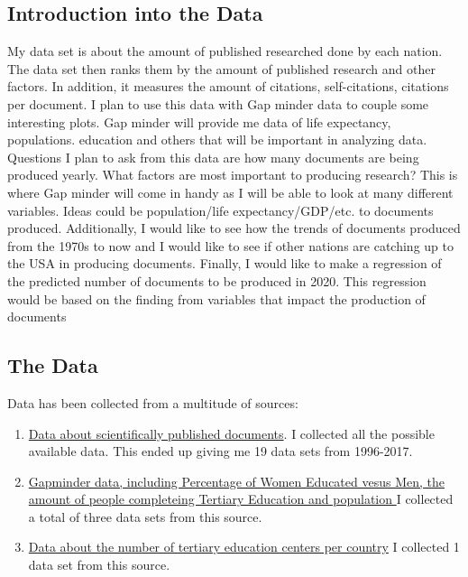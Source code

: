 \documentclass{article}\usepackage[]{graphicx}\usepackage[]{color}
\begin{document}
\subsection{Introduction into the Data}
My data set is about the amount of published researched done by each nation. The data set then ranks them by the amount of published research and other factors. In addition, it measures the amount of citations, self-citations, citations per document. I plan to use this data with Gap minder data to couple some interesting plots. Gap minder will provide me data of life expectancy, populations. education and others that will be important in analyzing data.
	Questions I plan to ask from this data are how many documents are being produced yearly. What factors are most important to producing research? This is where Gap minder will come in handy as I will be able to look at many different variables. Ideas could be population/life expectancy/GDP/etc. to documents produced. Additionally, I would like to see how the trends of documents produced from the 1970s to now and I would like to see if other nations are catching up to the USA in producing documents. Finally, I would like to make a regression of the predicted number of documents to be produced in 2020. This regression would be based on the finding from variables that impact the production of documents 

\subsection{The Data}
Data has been collected from a multitude of sources:
\begin{enumerate}
  \item \href{https://www.scimagojr.com/countryrank.php}{Data about scientifically published documents}. I collected all the possible available data. This ended up giving me 19 data sets from 1996-2017.
  \item \href{https://www.gapminder.org/data/}{Gapminder data, including Percentage of Women Educated vesus Men, the amount of people completeing Tertiary Education and population } I collected a total of three data sets from this source.
  \item \href{http://www.webometrics.info/en/node/54}{Data about the number of tertiary education centers per country} I collected 1 data set from this source.
\end{enumerate}
\end{document}
